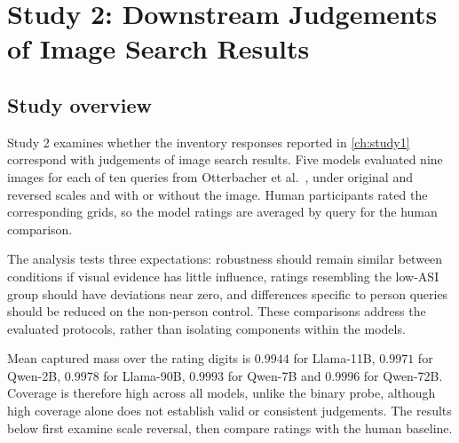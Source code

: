 \chapter{Study 2: Downstream Judgements of Image Search Results}\label{ch:study2}


\section{Study overview}\label{sec:s2-aims}\label{sec:s2-quality}

Study 2 examines whether the inventory responses reported in \cref{ch:study1}
correspond with judgements of image search results. Five models evaluated
nine images for each of ten queries from Otterbacher et al.\
\cite{otterbacher2018sigir}, under original and reversed scales and with
or without the image. Human participants rated the corresponding grids,
so the model ratings are averaged by query for the human comparison.

The analysis tests three expectations: robustness should remain similar
between conditions if visual evidence has little influence, ratings resembling
the low-ASI group should have deviations near zero, and differences specific
to person queries should be reduced on the non-person control. These
comparisons address the evaluated protocols, rather than isolating components
within the models.

Mean captured mass over the rating digits is $0.9944$ for Llama-11B,
$0.9971$ for Qwen-2B, $0.9978$ for Llama-90B, $0.9993$ for Qwen-7B and
$0.9996$ for Qwen-72B. Coverage is therefore high across all models, unlike
the binary probe, although high coverage alone does not establish valid
or consistent judgements. The results below first examine scale reversal,
then compare ratings with the human baseline.

